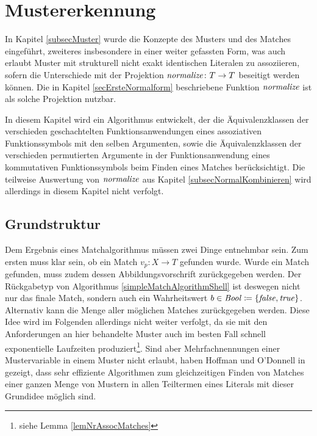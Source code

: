 

\chapter{Mustererkennung} \label{secPattermatching}

In Kapitel \ref{subsecMuster} wurde die Konzepte des Musters und des Matches eingeführt, zweiteres insbesondere in einer weiter gefassten Form, was auch erlaubt Muster mit strukturell nicht exakt identischen Literalen zu assoziieren, sofern die Unterschiede mit der Projektion $\mathit{normalize} \colon T \rightarrow T$ beseitigt werden können. Die in Kapitel \ref{secErsteNormalform} beschriebene Funktion $\mathit{normalize}$ ist als solche Projektion nutzbar.  

In diesem Kapitel wird ein Algorithmus entwickelt, der die Äquivalenzklassen der verschieden geschachtelten Funktionsanwendungen eines assoziativen Funktionssymbols mit den selben Argumenten, sowie die Äquivalenzklassen der verschieden permutierten Argumente in der Funktionsanwendung eines kommutativen Funktionssymbols beim Finden eines Matches berücksichtigt. Die teilweise Auswertung von $\mathit{normalize}$ aus Kapitel \ref{subsecNormalKombinieren} wird allerdings in diesem Kapitel nicht verfolgt.


\section{Grundstruktur} \label{subsecPatternmatchingGrundstruktur}

Dem Ergebnis eines Matchalgorithmus müssen zwei Dinge entnehmbar sein. Zum ersten muss klar sein, ob ein Match $v_p \colon X \rightarrow T$ gefunden wurde. Wurde ein Match gefunden, muss zudem dessen Abbildungsvorschrift zurückgegeben werden. Der Rückgabetyp von Algorithmus \ref{simpleMatchAlgorithmShell} ist deswegen nicht nur das finale Match, sondern auch ein Wahrheitswert $b \in \mathit{Bool} \coloneqq \{\mathit{false}, \mathit{true}\}$. Alternativ kann die Menge aller möglichen Matches zurückgegeben werden. Diese Idee wird im Folgenden allerdings nicht weiter verfolgt, da sie mit den Anforderungen an hier behandelte Muster auch im besten Fall schnell exponentielle Laufzeiten produziert\footnote{siehe Lemma \ref{lemNrAssocMatches}}. Sind aber Mehrfachnennungen einer Mustervariable in einem Muster nicht erlaubt, haben Hoffman und O'Donnell in \cite{patternMatchingInTrees} gezeigt, dass sehr effiziente Algorithmen zum gleichzeitigen Finden von Matches einer ganzen Menge von Mustern in allen Teiltermen eines Literals mit dieser Grundidee möglich sind.\\

